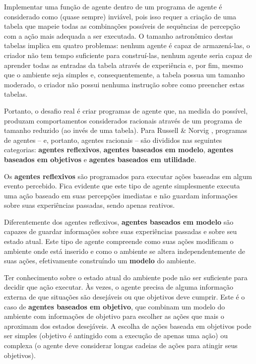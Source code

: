 Implementar uma função de agente dentro de um programa de agente é considerado
como (quase sempre) inviável, pois isso requer a criação de uma tabela que
mapeie todas as combinações possíveis de sequências de percepção com a ação mais
adequada a ser executada. O tamanho astronômico destas tabelas implica em quatro
problemas: nenhum agente é capaz de armazená-las, o criador não tem tempo
suficiente para construí-las, nenhum agente seria capaz de aprender todas as
entradas da tabela através de experiência e, por fim, mesmo que o ambiente seja
simples e, consequentemente, a tabela possua um tamanho moderado, o criador não
possui nenhuma instrução sobre como preencher estas tabelas.

Portanto, o desafio real é criar programas de agente que, na medida do possível,
produzam comportamentos considerados racionais através de um programa de tamanho
reduzido (ao invés de uma tabela). Para Russell \& Norvig
\cite{RussellNorvig200912}, programas de agentes -- e, portanto, agentes
racionais -- são divididos nas seguintes categorias: \textbf{agentes
reflexivos}, \textbf{agentes baseados em modelo}, \textbf{agentes baseados em
objetivos} e \textbf{agentes baseados em utilidade}.

Os \textbf{agentes reflexivos} são programados para executar ações baseadas em
algum evento percebido. Fica evidente que este tipo de agente simplesmente
executa uma ação baseado em suas percepções imediatas e não guardam informações
sobre suas experiências passadas, sendo apenas reativos.

Diferentemente dos agentes reflexivos, \textbf{agentes baseados em modelo} são
capazes de guardar informações sobre suas experiências passadas e sobre seu
estado atual. Este tipo de agente compreende como suas ações modificam o
ambiente onde está inserido e como o ambiente se altera independentemente de
suas ações, efetivamente construíndo um \textbf{modelo} do ambiente. 

Ter conhecimento sobre o estado atual do ambiente pode não ser suficiente para
decidir que ação executar. Às vezes, o agente precisa de alguma informação
externa de que situações são desejáveis ou que objetivos deve cumprir. Este é o
caso de \textbf{agentes baseados em objetivo}, que combinam um modelo do
ambiente com informações de objetivo para escolher as ações que mais o aproximam
dos estados desejáveis. A escolha de ações baseada em objetivos pode ser simples
(objetivo é antingido com a execução de apenas uma ação) ou complexa (o agente
deve considerar longas cadeias de ações para atingir seus objetivos).

